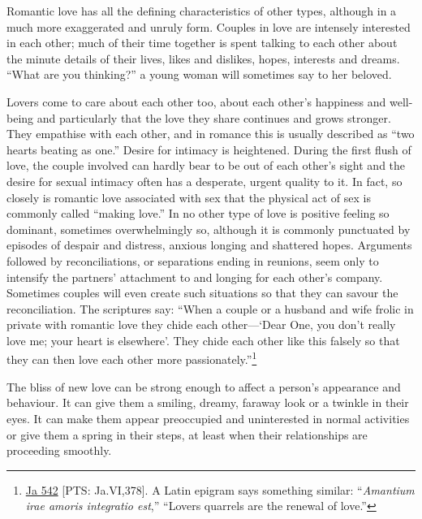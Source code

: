 \documentclass[10pt, openright]{book}
\begin{document}
Romantic love has all the defining characteristics of other types, although in a much more exaggerated and unruly form. Couples in love are intensely interested in each other; much of their time together is spent talking to each other about the minute details of their lives, likes and dislikes, hopes, interests and dreams. “What are you thinking?” a young woman will sometimes say to her beloved.


Lovers come to care about each other too, about each other’s happiness and well-being and particularly that the love they share continues and grows stronger. They empathise with each other, and in romance this is usually described as “two hearts beating as one.” Desire for intimacy is heightened. During the first flush of love, the couple involved can hardly bear to be out of each other’s sight and the desire for sexual intimacy often has a desperate, urgent quality to it. In fact, so closely is romantic love associated with sex that the physical act of sex is commonly called “making love.” In no other type of love is positive feeling so dominant, sometimes overwhelmingly so, although it is commonly punctuated by episodes of despair and distress, anxious longing and shattered hopes. Arguments followed by reconciliations, or separations ending in reunions, seem only to intensify the partners’ attachment to and longing for each other’s company. Sometimes couples will even create such situations so that they can savour the reconciliation. The scriptures say: “When a couple or a husband and wife frolic in private with romantic love they chide each other—‘Dear One, you don’t really love me; your heart is elsewhere’. They chide each other like this falsely so that they can then love each other more passionately.”\footnote {\href{https://suttacentral.net/ja542/en/cowell-rouse?reference=main/pts#pts-vp-pli378}{Ja 542} [PTS: Ja.VI,378]. A Latin epigram says something similar: “\textit{Amantium irae amoris integratio est},” “Lovers quarrels are the renewal of love.”}


The bliss of new love can be strong enough to affect a person’s appearance and behaviour. It can give them a smiling, dreamy, faraway look or a twinkle in their eyes. It can make them appear preoccupied and uninterested in normal activities or give them a spring in their steps, at least when their relationships are proceeding smoothly.
\end{document}
